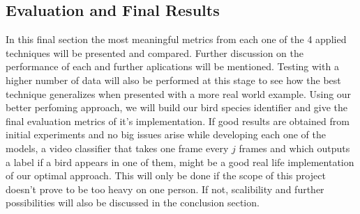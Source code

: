 \documentclass[11pt]{article}
\begin{document}
\begin{singlespace}
\section{Evaluation and Final Results}

In this final section the most meaningful metrics from each one of the 4 applied techniques will be presented and compared. Further discussion on the performance of each and further aplications will be mentioned. Testing with a higher number of data will also be performed at this stage to see how the best technique generalizes when presented with a more real world example. Using our better perfoming approach, we will build our bird species identifier and give the final evaluation metrics of it's implementation. If good results are obtained from initial experiments and no big issues arise while developing each one of the models, a video classifier that takes one frame every $j$ frames and which outputs a label if a bird appears in one of them, might be a good real life implementation of our optimal approach. This will only be done if the scope of this project doesn't prove to be too heavy on one person. If not, scalibility and further possibilities will also be discussed in the conclusion section. 



\end{singlespace}
\end{document}
